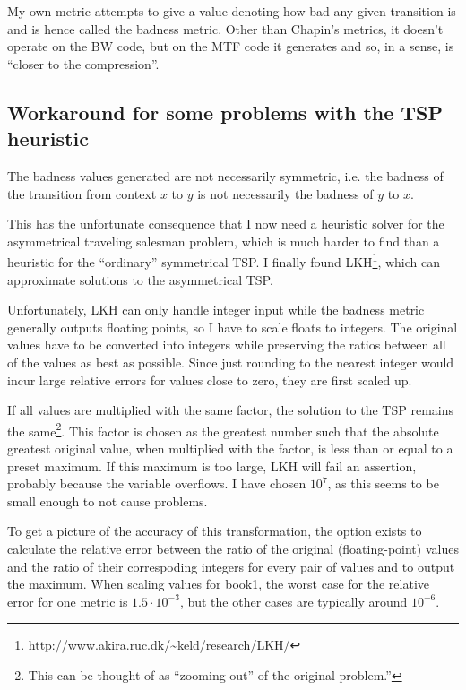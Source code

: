 \documentclass[a4paper]{scrreprt}
\begin{document}
My own metric attempts to give a value denoting how bad any given transition is
and is hence called the badness metric. Other than Chapin's metrics, it doesn't
operate on the BW code, but on the MTF code it generates and so, in a sense, is
``closer to the compression''.

\subsection{Workaround for some problems with the TSP heuristic}

The badness values generated are not necessarily symmetric, i.e. the badness of
the transition from context \(x\) to \(y\) is not necessarily the badness of
\(y\) to \(x\).

This has the unfortunate consequence that I now need a heuristic solver for the
asymmetrical traveling salesman problem, which is much harder to find than a
heuristic for the ``ordinary'' symmetrical TSP. I finally found
LKH\cite{helsgaun2000lkh}\footnote{\url{http://www.akira.ruc.dk/~keld/research/LKH/}},
which can approximate solutions to the asymmetrical TSP.

Unfortunately, LKH can only handle integer input while the badness metric
generally outputs floating points, so I have to scale floats to integers. The
original values have to be converted into integers while preserving the ratios
between all of the values as best as possible. Since just rounding to the
nearest integer would incur large relative errors for values close to zero, they
are first scaled up.

If all values are multiplied with the same factor, the solution to the TSP
remains the same\footnote{This can be thought of as ``zooming out'' of the
original problem.''}.
This factor is chosen as the greatest number such that the absolute greatest
original value, when multiplied with the factor, is less than or equal to a
preset maximum. If this maximum is too large, LKH will fail an assertion,
probably because the variable overflows. I have chosen \(10^7\), as this seems
to be small enough to not cause problems.

To get a picture of the accuracy of this transformation, the option exists to
calculate the relative error between the ratio of the original (floating-point)
values and the ratio of their correspoding integers for every pair of values and
to output the maximum. When scaling values for book1, the worst case for the
relative error for one metric is \(1.5 \cdot 10^{-3}\), but the other cases are
typically around \(10^{-6}\).
\end{document}
